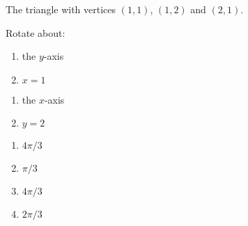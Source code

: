 {The triangle with vertices $(1,1)$, $(1,2)$ and $(2,1)$.

Rotate about:

\noindent%
\begin{minipage}[t]{.5\linewidth}
\begin{enumerate}
\item		the $y$-axis
\item		$x=1$
\end{enumerate}
\end{minipage}
\begin{minipage}[t]{.5\linewidth}
\begin{enumerate}\addtocounter{enumii}{2}
\item		the $x$-axis
\item		$y=2$
\end{enumerate}
\end{minipage}
}
{\begin{enumerate}
\item $4\pi/3$
\item $\pi/3$
\item $4\pi/3$
\item $2\pi/3$
\end{enumerate}
}
